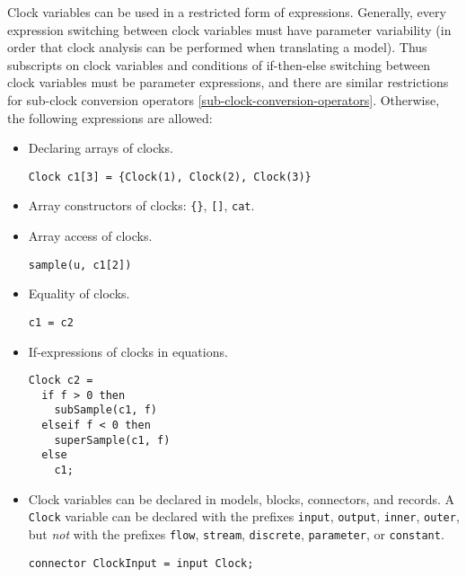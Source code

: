 Clock variables can be used in a restricted form of expressions.
Generally, every expression switching between clock variables must have parameter variability (in order that clock analysis can be performed when translating a model).
Thus subscripts on clock variables and conditions of if-then-else switching between clock variables must be parameter expressions, and there are similar restrictions for sub-clock conversion operators \cref{sub-clock-conversion-operators}.
Otherwise, the following expressions are allowed:
\begin{itemize}
\item
  Declaring arrays of clocks.
  \begin{example}
  \lstinline!Clock c1[3] = {Clock(1), Clock(2), Clock(3)}!
  \end{example}
\item
  Array constructors of clocks: \lstinline!{}!, \lstinline![]!, \lstinline!cat!.
\item
  Array access of clocks.
  \begin{example}
  \lstinline!sample(u, c1[2])!
  \end{example}
\item
  Equality of clocks.
  \begin{example}
  \lstinline!c1 = c2!
  \end{example}
\item
  If-expressions of clocks in equations.
  \begin{example}
\begin{lstlisting}[language=modelica]
Clock c2 =
  if f > 0 then
    subSample(c1, f)
  elseif f < 0 then
    superSample(c1, f)
  else
    c1;
\end{lstlisting}
  \lstinline!!
  \end{example}
\item
  Clock variables can be declared in models, blocks, connectors, and
  records. A \lstinline!Clock! variable can be declared with the prefixes
  \lstinline!input!, \lstinline!output!, \lstinline!inner!, \lstinline!outer!, but
  \emph{not} with the prefixes \lstinline!flow!, \lstinline!stream!,
  \lstinline!discrete!, \lstinline!parameter!, or \lstinline!constant!.
  \begin{example}
  \lstinline!connector ClockInput = input Clock;!
  \end{example}
\end{itemize}

